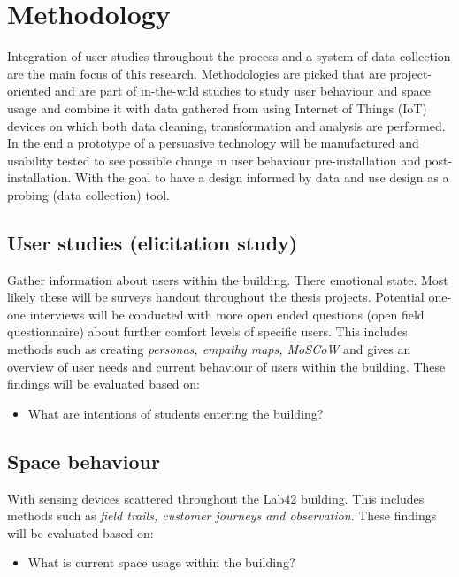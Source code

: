 \section{Methodology}

Integration of user studies throughout the process and a system of data collection are the main focus of this research. Methodologies are picked that are project-oriented and are part of in-the-wild studies to study user behaviour and space usage and combine it with data gathered from using Internet of Things (IoT) devices on which both data cleaning, transformation and analysis are performed. In the end a prototype of a persuasive technology will be manufactured and usability tested to see possible change in user behaviour pre-installation and post-installation. With the goal to have a design informed by data and use design as a probing (data collection) tool.

\subsection{User studies (elicitation study)}

Gather information about users within the building. There emotional state. Most likely these will be surveys handout throughout the thesis projects. Potential one-one interviews will be conducted with more open ended questions (open field questionnaire) about further comfort levels of specific users. This includes methods such as creating \emph{personas, empathy maps,  MoSCoW} and gives an overview of user needs and current behaviour of users within the building. These findings will be evaluated based on:

\begin{itemize}
  \item What are intentions of students entering the building?
\end{itemize}

\subsection{Space behaviour}

With sensing devices scattered throughout the Lab42 building. This includes methods such as \emph{field trails, customer journeys and observation}. These findings will be evaluated based on:

\begin{itemize}
  \item What is current space usage within the building?
\end{itemize}


